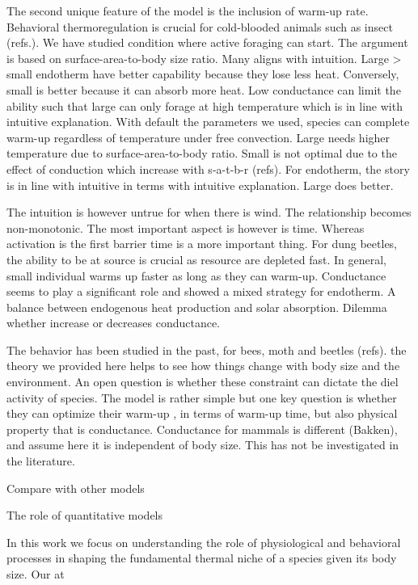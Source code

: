 The second unique feature of the model is the inclusion of warm-up rate.
Behavioral thermoregulation is crucial for cold-blooded animals such as insect (refs.).
We have studied condition where active foraging can start.
The argument is based on surface-area-to-body size ratio.
Many aligns with intuition. 
Large > small endotherm have better capability because they lose less heat.
Conversely, small is better because it can absorb more heat.
Low conductance can limit the ability such that large can only forage at high temperature which is in line with intuitive explanation.
With default the parameters we used, species can complete warm-up regardless of temperature under free convection.
Large needs higher temperature due to surface-area-to-body ratio. 
Small is not optimal due to the effect of conduction which increase with s-a-t-b-r (refs).
For endotherm, the story is in line with intuitive in terms with intuitive explanation.
Large does better. 

 The intuition is however untrue for when there is wind. 
The relationship becomes non-monotonic. 
The most important aspect is however is time.
Whereas activation is the first barrier time is a more important thing.
For dung beetles, the ability to be at source is crucial as resource are depleted fast.
In general, small individual warms up faster as long as they can warm-up. 
Conductance seems to play a significant role and showed a mixed strategy for endotherm.
A balance between endogenous heat production and solar absorption. 
Dilemma whether increase or decreases conductance.

The behavior has been studied in the past, for bees, moth and beetles (refs).
the theory we provided here helps to see how things change with body size and the environment.
An open question is whether these constraint can dictate the diel activity of species.
The model is rather simple but one key question is whether they can optimize their warm-up , in terms of warm-up time, but also physical property that is conductance.
Conductance for mammals is different (Bakken), and assume here it is independent of body size.
This has not be investigated in the literature.



Compare with other models




The role of quantitative models

In this work we focus on understanding the role of physiological and behavioral processes in shaping the fundamental thermal niche of a species given its body size.
Our at

